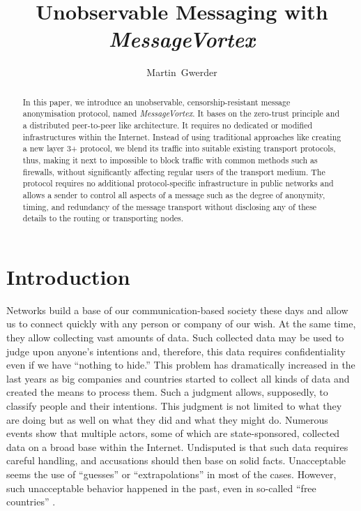 \documentclass[acmsmall, screen]{acmart}
\begin{document}
\title{Unobservable Messaging with \emph{MessageVortex}}

\author{Martin~Gwerder}



\begin{abstract}
In this paper, we introduce an unobservable, censorship-resistant message anonymisation protocol, named \emph{MessageVortex}. It bases on the zero-trust principle and a distributed peer-to-peer like architecture. It requires no dedicated or modified infrastructures within the Internet. Instead of using traditional approaches like creating a new layer 3+ protocol, we blend its traffic into suitable existing transport protocols, thus, making it next to impossible to block traffic with common methods such as firewalls, without significantly affecting regular users of the transport medium. The protocol requires no additional protocol-specific infrastructure in public networks and allows a sender to control all aspects of a message such as the degree of anonymity, timing, and redundancy of the message transport without disclosing any of these details to the routing or transporting nodes. 
\end{abstract}

\maketitle

\section{Introduction\label{sec:introduction}}
Networks build a base of our communication-based society these days and allow us to connect quickly with any person or company of our wish. At the same time, they allow collecting vast amounts of data. Such collected data may be used to judge upon anyone's intentions and, therefore, this data requires confidentiality even if we have ``nothing to hide.'' This problem has dramatically increased in the last years as big companies and countries started to collect all kinds of data and created the means to process them. Such a judgment allows, supposedly, to classify people and their intentions. This judgment is not limited to what they are doing but as well on what they did and what they might do. Numerous events show that multiple actors, some of which are state-sponsored, collected data on a broad base within the Internet. Undisputed is that such data requires careful handling, and accusations should then base on solid facts. Unacceptable seems the use of ``guesses'' or ``extrapolations'' in most of the cases. However, such unacceptable behavior happened in the past, even in so-called ``free countries'' \cite{Leuenberger1989}.
\end{document}
